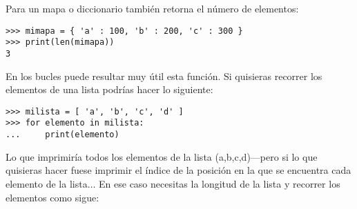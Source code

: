\noindent
Para un mapa o diccionario también retorna el número de elementos:

\begin{listing}
\begin{verbatim}
>>> mimapa = { 'a' : 100, 'b' : 200, 'c' : 300 }
>>> print(len(mimapa))
3
\end{verbatim}
\end{listing}

\noindent
En los bucles puede resultar muy útil esta función. Si quisieras recorrer los elementos de una lista podrías hacer lo siguiente:

\begin{listing}
\begin{verbatim}
>>> milista = [ 'a', 'b', 'c', 'd' ]
>>> for elemento in milista:
...     print(elemento)
\end{verbatim}
\end{listing}

\noindent
Lo que imprimiría todos los elementos de la lista (a,b,c,d)---pero si lo que quisieras hacer fuese imprimir el índice de la posición en la que se encuentra cada elemento de la lista$\ldots$   En ese caso necesitas la longitud de la lista y recorrer los elementos como sigue:

